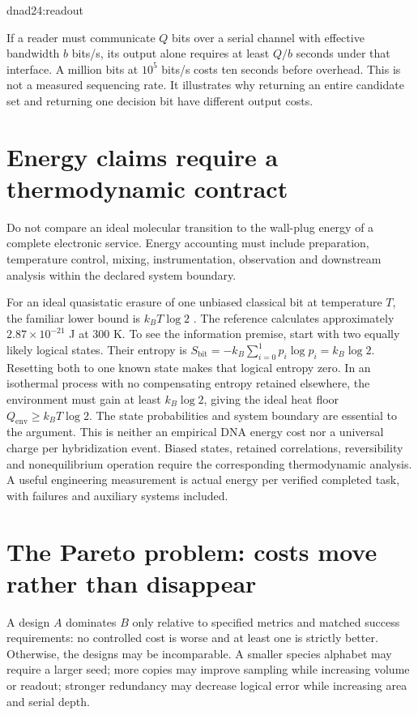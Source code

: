 {dnad24:readout}

If a reader must communicate $Q$ bits over a serial channel with effective
bandwidth $b$ bits/s, its output alone requires at least $Q/b$ seconds under that
interface. A million bits at $10^5$ bits/s costs ten seconds before overhead.
This is not a measured sequencing rate. It illustrates why returning an entire
candidate set and returning one decision bit have different output costs.

\section{Energy claims require a thermodynamic contract}
Do not compare an ideal molecular transition to the wall-plug energy of a complete
electronic service. Energy accounting must include preparation, temperature
control, mixing, instrumentation, observation and downstream analysis within the
declared system boundary.

For an ideal quasistatic erasure of one unbiased classical bit at temperature
$T$, the familiar lower bound is $k_BT\log2$ \cite{dnad24:landauer}.
The reference calculates approximately $2.87\times10^{-21}$ J at 300 K.
To see the information premise, start with two equally likely logical states.
Their entropy is $S_{\mathrm{bit}}=-k_B\sum_{i=0}^1p_i\log p_i=k_B\log2$.
Resetting both to one known state makes that logical entropy zero. In an
isothermal process with no compensating entropy retained elsewhere, the
environment must gain at least $k_B\log2$, giving the ideal heat floor
$Q_{\mathrm{env}}\ge k_BT\log2$. The state probabilities and system boundary
are essential to the argument.
This is neither an empirical DNA energy cost nor a universal charge per hybridization
event. Biased states, retained correlations, reversibility and nonequilibrium
operation require the corresponding thermodynamic analysis. A useful engineering
measurement is actual energy per verified completed task, with failures and
auxiliary systems included.

\section{The Pareto problem: costs move rather than disappear}
A design $A$ dominates $B$ only relative to specified metrics and matched success
requirements: no controlled cost is worse and at least one is strictly better.
Otherwise, the designs may be incomparable.
A smaller species alphabet may require a larger seed; more copies may improve
sampling while increasing volume or readout; stronger redundancy may decrease
logical error while increasing area and serial depth.

